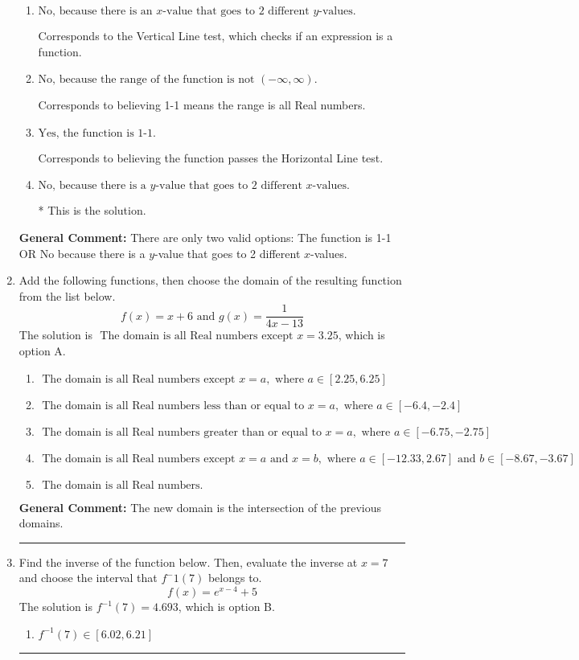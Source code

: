 \documentclass{extbook}[14pt]
\newcommand{\litem}[1]{\item #1

\rule{\textwidth}{0.4pt}}
\begin{document}
\begin{enumerate}
{\begin{enumerate}[label=\Alph*.]
Corresponds to believing 1-1 means the domain is all Real numbers.
\item \( \text{No, because there is an $x$-value that goes to 2 different $y$-values.} \)

Corresponds to the Vertical Line test, which checks if an expression is a function.
\item \( \text{No, because the range of the function is not $(-\infty, \infty)$.} \)

Corresponds to believing 1-1 means the range is all Real numbers.
\item \( \text{Yes, the function is 1-1.} \)

Corresponds to believing the function passes the Horizontal Line test.
\item \( \text{No, because there is a $y$-value that goes to 2 different $x$-values.} \)

* This is the solution.
\end{enumerate}

\textbf{General Comment:} There are only two valid options: The function is 1-1 OR No because there is a $y$-value that goes to 2 different $x$-values.
}
\litem{
Add the following functions, then choose the domain of the resulting function from the list below.
\[ f(x) = x + 6 \text{ and } g(x) = \frac{1}{4x-13} \]The solution is \( \text{ The domain is all Real numbers except } x = 3.25 \), which is option A.\begin{enumerate}[label=\Alph*.]
\item \( \text{ The domain is all Real numbers except } x = a, \text{ where } a \in [2.25, 6.25] \)


\item \( \text{ The domain is all Real numbers less than or equal to } x = a, \text{ where } a \in [-6.4, -2.4] \)


\item \( \text{ The domain is all Real numbers greater than or equal to } x = a, \text{ where } a \in [-6.75, -2.75] \)


\item \( \text{ The domain is all Real numbers except } x = a \text{ and } x = b, \text{ where } a \in [-12.33, 2.67] \text{ and } b \in [-8.67, -3.67] \)


\item \( \text{ The domain is all Real numbers. } \)


\end{enumerate}

\textbf{General Comment:} The new domain is the intersection of the previous domains.
}
\litem{
Find the inverse of the function below. Then, evaluate the inverse at $x = 7$ and choose the interval that $f^-1(7)$ belongs to.
\[ f(x) = e^{x-4}+5 \]The solution is \( f^{-1}(7) = 4.693 \), which is option B.\begin{enumerate}[label=\Alph*.]
\item \( f^{-1}(7) \in [6.02, 6.21] \)


\end{enumerate}}
\end{enumerate}
\end{document}
